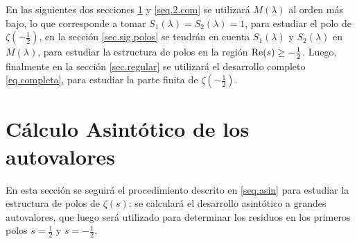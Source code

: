 En las siguientes dos secciones \ref{seq.2.asin} y \ref{seq.2.com} se utilizará $M ( \lambda )$ al orden más bajo, lo que corresponde a tomar $S _1 (\lambda) = S _2 ( \lambda )= 1$, para estudiar el polo de $\zeta \left( - \frac{1}{2} \right)$, en la sección \ref{sec.sig.polos} se tendrán en cuenta $S _1 (\lambda)$ y $S _2 ( \lambda )$ en $M ( \lambda)$, para estudiar la estructura de polos en la región ${\rm Re }(s) \geq - \frac{1}{2}$.
Luego, finalmente en la sección \ref{sec.regular} se utilizará el desarrollo completo \eqref{eq.completa}, para estudiar la parte finita de $\zeta \left( - \frac{1}{2} \right)$.

\section{Cálculo Asintótico de los autovalores}\label{seq.2.asin}

En esta sección se seguirá el procedimiento descrito en \ref{seq.asin} para estudiar la estructura de polos de $\zeta (s)$: se calculará el desarrollo asintótico a grandes autovalores, que luego será utilizado para determinar los residuos en los primeros polos $s= \frac{1}{2}$ y $s= - \frac{1}{2}$.



